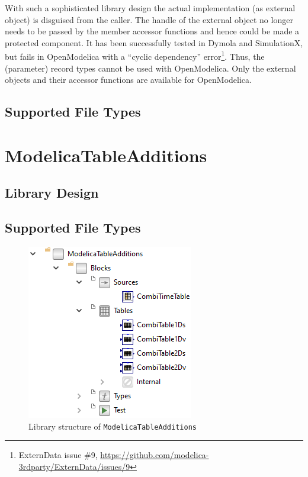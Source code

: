 \documentclass{modelica}
\newcommand{\modelica}[1]{\lstinline[language=modelica]|#1|}
\begin{document}
With such a sophisticated library design the actual implementation (as external object) is disguised from the caller. The handle of the external object no longer needs to be passed by the member accessor functions and hence could be made a protected component. It has been successfully tested in Dymola and SimulationX, but fails in OpenModelica with a ``cyclic dependency'' error\footnote{ExternData issue \#9, \url{https://github.com/modelica-3rdparty/ExternData/issues/9}}. Thus, the (parameter) record types cannot be used with OpenModelica.
Only the external objects and their accessor functions are available for OpenModelica.

\subsection{Supported File Types}

\section{ModelicaTableAdditions}

\subsection{Library Design}

\subsection{Supported File Types}

\begin{figure}[!hb]
\centering
\includegraphics[scale=0.8]{resources/ModelicaTableAdditions.png}
\caption{Library structure of \modelica{ModelicaTableAdditions}}
\label{fig:ModelicaTableAdditions}
\end{figure}
\end{document}
